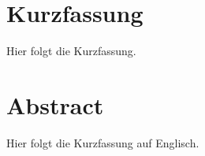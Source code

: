 \chapter*{Kurzfassung}
Hier folgt die Kurzfassung.

\newpage
\chapter*{Abstract}
Hier folgt die Kurzfassung auf Englisch.
